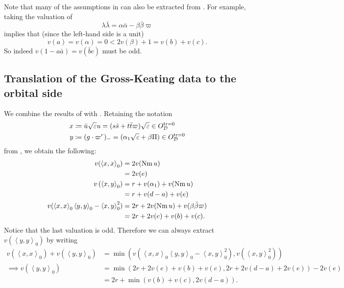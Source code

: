 \begin{remark}
  Note that many of the assumptions in 
  can also be extracted from .
  For example, taking the valuation of
  \[ \lambda \bar \lambda = \alpha \bar \alpha - \beta \bar \beta \varpi \]
  implies that (since the left-hand side is a unit)
  \[ v(a) = v(\alpha) = 0 <  2v(\beta) + 1 = v(b) + v(c). \]
  So indeed $v(1-a \bar a) = v(\bar bc)$ must be odd.
\end{remark}

\subsection{Translation of the Gross-Keating data to the orbital side}
We combine the results of  with .
Retaining the notation
\begin{align*}
  x &\coloneqq \bar u \sqrt{\varepsilon} u = (s \bar s + t \bar t \varpi) \sqrt{\varepsilon} \in O_\mathcal D^{\operatorname{tr} = 0} \\
  y &\coloneqq (g \cdot \varpi^r)_- = (\alpha_1\sqrt{\varepsilon} + \beta \Pi) \in O_\mathcal D^{\operatorname{tr} = 0}
\end{align*}
from , we obtain the following:
\begin{align*}
  v(\left\langle x,x \right\rangle _0)
    &= 2 v(\operatorname{Nm} u) \\
    &= 2v(e) \\
  v\left( \left\langle x,y \right\rangle _0 \right)
    &= r + v(\alpha_1) + v(\operatorname{Nm} u) \\
    &= r + v(d-a) + v(e) \\
  v(
    \left\langle x,x \right\rangle _0 \left\langle y,y \right\rangle _0
    - \left\langle x,y \right\rangle^2_0
  )
    &= 2r + 2 v(\operatorname{Nm} u) + v(\beta \bar\beta \varpi) \\
    &= 2r + 2v(e) + v(b) + v(c).
\end{align*}
Notice that the last valuation is odd.
Therefore we can always extract $v(\left\langle y,y \right\rangle _0)$ by writing
\begin{align*}
  v\left(\left\langle x,x \right\rangle _0\right) + v\left(\left\langle y,y \right\rangle _0\right)
  &= \min \left( v\left( \left\langle x,x \right\rangle _0 \left\langle y,y \right\rangle _0 - \left\langle x,y \right\rangle^2_0 \right),
    v(\left\langle x,y \right\rangle^2_0) \right) \\
  \implies  v\left(\left\langle y,y \right\rangle _0\right)
  &= \min(2r + 2v(e) + v(b) + v(c), 2r + 2v(d-a) + 2v(e)) - 2v(e) \\
  &= 2r + \min(v(b) + v(c), 2v(d-a)).
\end{align*}
